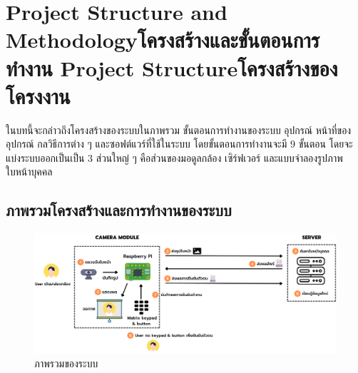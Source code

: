 \chapter{\ifproject%
\ifenglish Project Structure and Methodology\else โครงสร้างและขั้นตอนการทำงาน\fi
\else%
\ifenglish Project Structure\else โครงสร้างของโครงงาน\fi
\fi
}

ในบทนี้จะกล่าวถึงโครงสร้างของระบบในภาพรวม ขั้นตอนการทํางานของระบบ อุปกรณ์ หน้าที่ของอุปกรณ์ กลวิธีการต่าง ๆ และซอฟต์แวร์ที่ใช้ในระบบ โดยขั้นตอนการทํางานจะมี 9 ขั้นตอน
โดยจะแบ่งระบบออกเป็นเป็น 3 ส่วนใหญ่ ๆ คือส่วนของมอดูลกล้อง เซิร์ฟเวอร์ และแบบจำลองรูปภาพใบหน้าบุคคล

\makeatletter


\makeatother



\section{ภาพรวมโครงสร้างและการทำงานของระบบ}


\begin{figure}[ht!]
  \begin{center}
    \includegraphics[scale=.5]{pic/overview.png}
  \caption[ภาพรวมของระบบ]{ภาพรวมของระบบ}
  \end{center}
  \label{fig:overview}
\end{figure}

